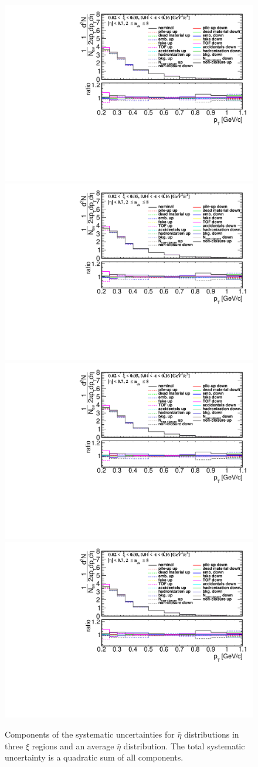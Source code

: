 \begin{figure}[h!]
	\centering
	\includegraphics[width=.49\textwidth,page=5]{chapters/chrgSTAR/img/syst/out_chargedmax.pdf}
	\hfill
	\includegraphics[width=.49\textwidth,page=11]{chapters/chrgSTAR/img/syst/out_chargedmax.pdf}
	\newline
	\includegraphics[width=.49\textwidth,page=17]{chapters/chrgSTAR/img/syst/out_chargedmax.pdf}
	\hfill
	\includegraphics[width=.49\textwidth,page=21]{chapters/chrgSTAR/img/syst/out_chargedmax.pdf}
	\caption[Components of the systematic uncertainties for $\bar{\eta}$ distributions in three $\xi$ regions and the average $\bar{\eta}$ distribution]{Components of the systematic uncertainties for $\bar{\eta}$ distributions in three $\xi$ regions and an average $\bar{\eta}$ distribution. The total  systematic uncertainty is a quadratic sum of all  components.}
	\label{fig:results_star_eta_syst}
\end{figure}	
